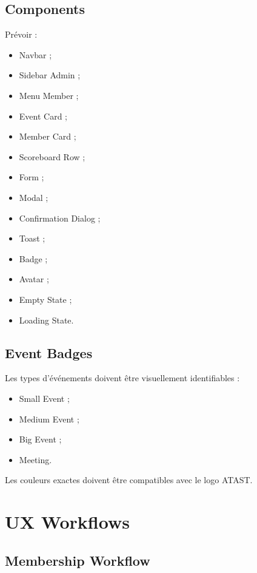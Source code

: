 \documentclass[11pt,a4paper]{report}
\begin{document}
\section{Components}

Prévoir :

\begin{itemize}
    \item Navbar ;
    \item Sidebar Admin ;
    \item Menu Member ;
    \item Event Card ;
    \item Member Card ;
    \item Scoreboard Row ;
    \item Form ;
    \item Modal ;
    \item Confirmation Dialog ;
    \item Toast ;
    \item Badge ;
    \item Avatar ;
    \item Empty State ;
    \item Loading State.
\end{itemize}

\section{Event Badges}

Les types d'événements doivent être visuellement identifiables :

\begin{itemize}
    \item Small Event ;
    \item Medium Event ;
    \item Big Event ;
    \item Meeting.
\end{itemize}

Les couleurs exactes doivent être compatibles avec le logo ATAST.

\chapter{UX Workflows}

\section{Membership Workflow}
\end{document}
